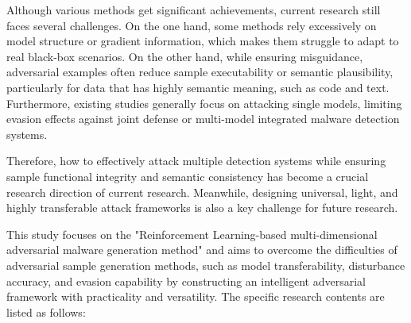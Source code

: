 Although various methods get significant achievements, current research still faces several challenges. On the one hand, some methods rely excessively on model structure or gradient information, which makes them struggle to adapt to real black-box scenarios. On the other hand, while ensuring misguidance, adversarial examples often reduce sample executability or semantic plausibility, particularly for data that has highly semantic meaning, such as code and text. Furthermore, existing studies generally focus on attacking single models, limiting evasion effects against joint defense or multi-model integrated malware detection systems.

Therefore, how to effectively attack multiple detection systems while ensuring sample functional integrity and semantic consistency has become a crucial research direction of current research. Meanwhile, designing universal, light, and highly transferable attack frameworks is also a key challenge for future research.

This study focuses on the "Reinforcement Learning-based multi-dimensional adversarial malware generation method" and aims to overcome the difficulties of adversarial sample generation methods, such as model transferability, disturbance accuracy, and evasion capability by constructing an intelligent adversarial framework with practicality and versatility. The specific research contents are listed as follows:


